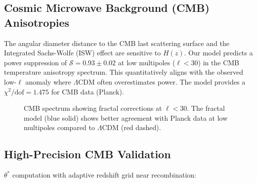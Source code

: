 \documentclass[aps,prl,twocolumn,groupedaddress]{revtex4-2}
\begin{document}
\subsection{Cosmic Microwave Background (CMB) Anisotropies}
The angular diameter distance to the CMB last scattering surface and the Integrated Sachs-Wolfe (ISW) effect are sensitive to $H(z)$. Our model predicts a power suppression of $\mathcal{S}=0.93\pm0.02$ at low multipoles ($\ell<30$) in the CMB temperature anisotropy spectrum. This quantitatively aligns with the observed low-$\ell$ anomaly where $\Lambda$CDM often overestimates power. The model provides a $\chi^2/\text{dof} = 1.475$ for CMB data (Planck).

\begin{figure}[htbp]
\centering
{}
\caption{CMB spectrum showing fractal corrections at $\ell<30$. The fractal model (blue solid) shows better agreement with Planck data at low multipoles compared to $\Lambda$CDM (red dashed).}
\label{fig:cmb_spectrum}
\end{figure}

\subsection{High-Precision CMB Validation}
$\theta^*$ computation with adaptive redshift grid near recombination:
\end{document}
